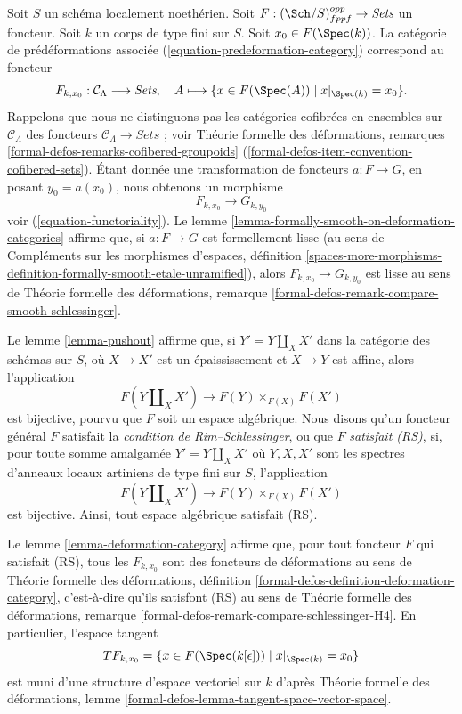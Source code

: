 \medskip\noindent
Soit $S$ un schéma localement noethérien. Soit
$F : (\Sch/S)_{fppf}^{opp} \to \textit{Sets}$ un foncteur. Soit $k$ un corps
de type fini sur $S$. Soit $x_0 \in F(\Spec(k))$. La catégorie de
prédéformations associée (\ref{equation-predeformation-category}) correspond
au foncteur
$$
F_{k, x_0} : \mathcal{C}_\Lambda \longrightarrow \textit{Sets},
\quad
A \longmapsto \{x \in F(\Spec(A)) \mid x|_{\Spec(k)} = x_0 \}.
$$
Rappelons que nous ne distinguons pas les catégories cofibrées en ensembles
sur $\mathcal{C}_\Lambda$ des foncteurs
$\mathcal{C}_\Lambda \to \textit{Sets}$ ; voir Théorie formelle des
déformations, remarques
\ref{formal-defos-remarks-cofibered-groupoids}
(\ref{formal-defos-item-convention-cofibered-sets}).
Étant donnée une transformation de foncteurs $a : F \to G$, en posant
$y_0 = a(x_0)$, nous obtenons un morphisme
$$
F_{k, x_0} \longrightarrow G_{k, y_0}
$$
voir (\ref{equation-functoriality}). Le lemme
\ref{lemma-formally-smooth-on-deformation-categories} affirme que, si
$a : F \to G$ est formellement lisse (au sens de Compléments sur les
morphismes d'espaces, définition
\ref{spaces-more-morphisms-definition-formally-smooth-etale-unramified}), alors
$F_{k, x_0} \longrightarrow G_{k, y_0}$ est lisse au sens de Théorie formelle
des déformations, remarque
\ref{formal-defos-remark-compare-smooth-schlessinger}.

\medskip\noindent
Le lemme \ref{lemma-pushout} affirme que, si $Y' = Y \amalg_X X'$ dans la
catégorie des schémas sur $S$, où $X \to X'$ est un épaississement et
$X \to Y$ est affine, alors l'application
$$
F(Y \amalg_X X') \to F(Y) \times_{F(X)} F(X')
$$
est bijective, pourvu que $F$ soit un espace algébrique. Nous disons qu'un
foncteur général $F$ satisfait la {\it condition de Rim--Schlessinger}, ou que
$F$ {\it satisfait (RS)}, si, pour toute somme amalgamée
$Y' = Y \amalg_X X'$ où $Y, X, X'$ sont les spectres d'anneaux locaux
artiniens de type fini sur $S$, l'application
$$
F(Y \amalg_X X') \to F(Y) \times_{F(X)} F(X')
$$
est bijective. Ainsi, tout espace algébrique satisfait (RS).

\medskip\noindent
Le lemme \ref{lemma-deformation-category} affirme que, pour tout foncteur $F$
qui satisfait (RS), tous les $F_{k, x_0}$ sont des foncteurs de déformations
au sens de Théorie formelle des déformations, définition
\ref{formal-defos-definition-deformation-category}, c'est-à-dire qu'ils
satisfont (RS) au sens de Théorie formelle des déformations, remarque
\ref{formal-defos-remark-compare-schlessinger-H4}.
En particulier, l'espace tangent
$$
TF_{k, x_0} = \{x \in F(\Spec(k[\epsilon])) \mid x|_{\Spec(k)} = x_0\}
$$
est muni d'une structure d'espace vectoriel sur $k$ d'après Théorie formelle
des déformations, lemme
\ref{formal-defos-lemma-tangent-space-vector-space}.

